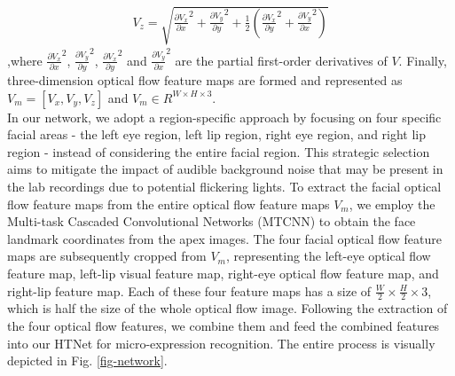 \documentclass[review,12pt, 3p]{elsarticle}
\begin{document}
\begin{equation}
\begin{aligned}
V_z =\sqrt{  \frac{\partial V_x}{\partial x}^2  + \frac{\partial V_y}{\partial y}^2 +\frac{1}{2} ( \frac{\partial V_x}{\partial y}^2 + \frac{\partial V_y}{\partial x}^2   )  }
\end{aligned}
\label{variation-optical}
\end{equation}
,where $ \frac{\partial V_x}{\partial x}^2 $, $ \frac{\partial V_y}{\partial y}^2$, $\frac{\partial V_x}{\partial y}^2 $ and $\frac{\partial V_y}{\partial x}^2 $ are the  partial first-order derivatives of $V$. Finally, three-dimension optical flow feature maps are formed and represented as $V_m = [V_x,V_y,V_z]$ and  $V_m \in R^{W\times H \times 3}$. \\
In our network, we adopt a region-specific approach by focusing on four specific facial areas - the left eye region, left lip region, right eye region, and right lip region - instead of considering the entire facial region. This strategic selection aims to mitigate the impact of audible background noise that may be present in the lab recordings due to potential flickering lights. To extract the facial optical flow feature maps from the entire optical flow feature maps $V_m$, we employ the Multi-task Cascaded Convolutional Networks (MTCNN) \cite{ref-42} to obtain the face landmark coordinates from the apex images. The four facial optical flow feature maps are subsequently cropped from $V_m$, representing the left-eye optical flow feature map, left-lip visual feature map, right-eye optical flow feature map, and right-lip feature map. Each of these four feature maps has a size of $\frac{W}{2} \times \frac{H}{2} \times 3$, which is half the size of the whole optical flow image. Following the extraction of the four optical flow features, we combine them and feed the combined features into our HTNet for micro-expression recognition. The entire process is visually depicted in Fig. \ref{fig-network}.\\
\end{document}
